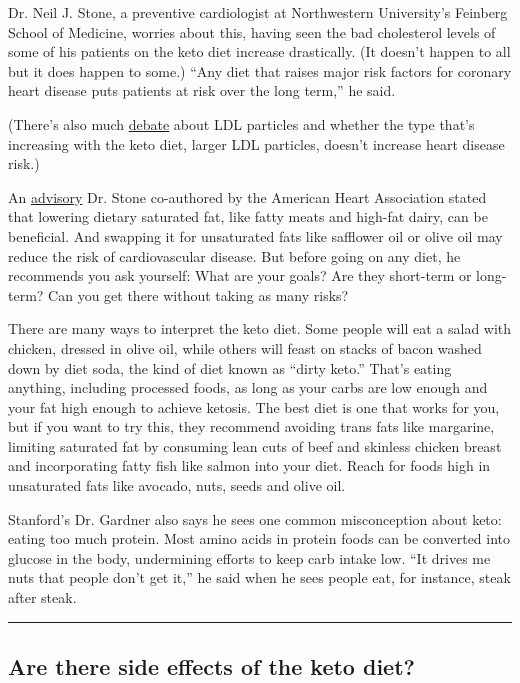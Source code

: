Dr. Neil J. Stone, a preventive cardiologist at Northwestern
University's Feinberg School of Medicine, worries about this, having
seen the bad cholesterol levels of some of his patients on the keto diet
increase drastically. (It doesn't happen to all but it does happen to
some.) ``Any diet that raises major risk factors for coronary heart
disease puts patients at risk over the long term,'' he said.

(There's also much
\href{https://www.atherosclerosis-journal.com/article/S0021-9150(19)31589-8/fulltext}{debate}
about LDL particles and whether the type that's increasing with the keto
diet, larger LDL particles, doesn't increase heart disease risk.)

An
\href{https://ahajournals.org/doi/10.1161/CIR.0000000000000510}{advisory}
Dr. Stone co-authored by the American Heart Association stated that
lowering dietary saturated fat, like fatty meats and high-fat dairy, can
be beneficial. And swapping it for unsaturated fats like safflower oil
or olive oil may reduce the risk of cardiovascular disease. But before
going on any diet, he recommends you ask yourself: What are your goals?
Are they short-term or long-term? Can you get there without taking as
many risks?

There are many ways to interpret the keto diet. Some people will eat a
salad with chicken, dressed in olive oil, while others will feast on
stacks of bacon washed down by diet soda, the kind of diet known as
``dirty keto.'' That's eating anything, including processed foods, as
long as your carbs are low enough and your fat high enough to achieve
ketosis. The best diet is one that works for you, but if you want to try
this, they recommend avoiding trans fats like margarine, limiting
saturated fat by consuming lean cuts of beef and skinless chicken breast
and incorporating fatty fish like salmon into your diet. Reach for foods
high in unsaturated fats like avocado, nuts, seeds and olive oil.

Stanford's Dr. Gardner also says he sees one common misconception about
keto: eating too much protein. Most amino acids in protein foods can be
converted into glucose in the body, undermining efforts to keep carb
intake low. ``It drives me nuts that people don't get it,'' he said when
he sees people eat, for instance, steak after steak.

\begin{center}\rule{0.5\linewidth}{\linethickness}\end{center}

\hypertarget{are-there-side-effects-of-the-keto-diet}{%
\subsection{Are there side effects of the keto
diet?}\label{are-there-side-effects-of-the-keto-diet}}

